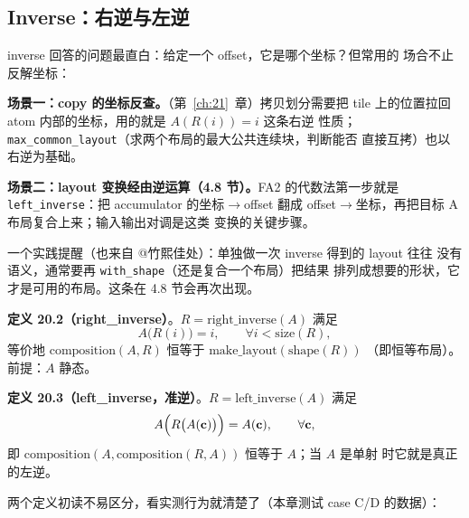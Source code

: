 \subsection{Inverse：右逆与左逆}

inverse 回答的问题最直白：给定一个 offset，它是哪个坐标？但常用的
场合不止反解坐标：

\textbf{场景一：copy 的坐标反查。}（第~\ref{ch:21}~章）拷贝划分需要把
tile 上的位置拉回 atom 内部的坐标，用的就是 $A(R(i))=i$ 这条右逆
性质；\texttt{max\_\allowbreak{}common\_\allowbreak{}layout}（求两个布局的最大公共连续块，判断能否
直接互拷）也以右逆为基础。

\textbf{场景二：layout 变换经由逆运算（4.8 节）。}\allowbreak{}FA2 的代数法第一步就是
\texttt{left\_\allowbreak{}inverse}：把 accumulator 的坐标$\to$offset 翻成
offset$\to$坐标，再把目标 A 布局复合上来；输入输出对调是这类
变换的关键步骤。

一个实践提醒（也来自 @竹熙佳处）：单独做一次 inverse 得到的 layout 往往
没有语义，通常要再 \texttt{with\_shape}（还是复合一个布局）把结果
排列成想要的形状，它才是可用的布局。这条在 4.8 节会再次出现。

\textbf{定义 20.2（right\_inverse）}。$R=\mathrm{right\_inverse}(A)$ 满足
\begin{equation}
  A\bigl(R(i)\bigr) = i , \qquad \forall i < \mathrm{size}(R) ,
  \label{eq:20-right-inv}
\end{equation}
等价地 $\mathrm{composition}(A,R)$ 恒等于 $\mathrm{make\_layout}(\mathrm{shape}(R))$
（即恒等布局）。前提：$A$ 静态。

\textbf{定义 20.3（left\_inverse，准逆）}。$R=\mathrm{left\_inverse}(A)$ 满足
\begin{equation}
  A\Bigl(R\bigl(A(\mathbf{c})\bigr)\Bigr) = A(\mathbf{c}) , \qquad \forall \mathbf{c},
  \label{eq:20-left-inv}
\end{equation}
即 $\mathrm{composition}(A,\mathrm{composition}(R,A))$ 恒等于 $A$；当 $A$ 是单射
时它就是真正的左逆。

两个定义初读不易区分，看实测行为就清楚了（本章测试 case C/D 的数据）：

